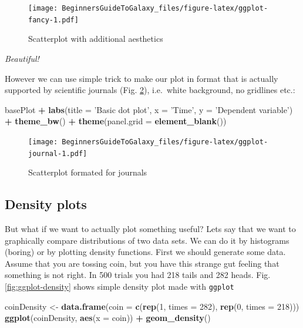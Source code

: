 \documentclass[]{book}
\newenvironment{Shaded}{\begin{snugshade}}{\end{snugshade}}
\newcommand{\KeywordTok}[1]{\textcolor[rgb]{0.13,0.29,0.53}{\textbf{#1}}}
\newcommand{\DataTypeTok}[1]{\textcolor[rgb]{0.13,0.29,0.53}{#1}}
\newcommand{\DecValTok}[1]{\textcolor[rgb]{0.00,0.00,0.81}{#1}}
\newcommand{\StringTok}[1]{\textcolor[rgb]{0.31,0.60,0.02}{#1}}
\newcommand{\OperatorTok}[1]{\textcolor[rgb]{0.81,0.36,0.00}{\textbf{#1}}}
\newcommand{\NormalTok}[1]{#1}
\theoremstyle{definition}
\theoremstyle{definition}
\theoremstyle{definition}
\theoremstyle{remark}
\begin{document}
\begin{figure}
\centering
\texttt{[image: BeginnersGuideToGalaxy\_files/figure-latex/ggplot-fancy-1.pdf]}
\caption{\label{fig:ggplot-fancy}Scatterplot with additional aesthetics}
\end{figure}

\emph{Beautiful!}

However we can use simple trick to make our plot in format that is
actually supported by scientific journals (Fig.
\ref{fig:ggplot-journal}), i.e.~white background, no gridlines etc.:

\begin{Shaded}
\begin{Highlighting}[]
\NormalTok{basePlot }\OperatorTok{+}
\StringTok{  }\KeywordTok{labs}\NormalTok{(}\DataTypeTok{title =} \StringTok{'Basic dot plot'}\NormalTok{, }\DataTypeTok{x =} \StringTok{'Time'}\NormalTok{, }\DataTypeTok{y =} \StringTok{'Dependent variable'}\NormalTok{) }\OperatorTok{+}
\StringTok{  }\KeywordTok{theme_bw}\NormalTok{() }\OperatorTok{+}
\StringTok{  }\KeywordTok{theme}\NormalTok{(}\DataTypeTok{panel.grid =} \KeywordTok{element_blank}\NormalTok{())}
\end{Highlighting}
\end{Shaded}

\begin{figure}
\centering
\texttt{[image: BeginnersGuideToGalaxy\_files/figure-latex/ggplot-journal-1.pdf]}
\caption{\label{fig:ggplot-journal}Scatterplot formated for journals}
\end{figure}

\subsection{Density plots}\label{density-plots}

But what if we want to actually plot something useful? Lets say that we
want to graphically compare distributions of two data sets. We can do it
by histograms (boring) or by plotting density functions. First we should
generate some data. Assume that you are tossing coin, but you have this
strange gut feeling that something is not right. In 500 trials you had
218 tails and 282 heads. Fig. \ref{fig:ggplot-density} shows simple
density plot made with \texttt{ggplot}

\begin{Shaded}
\begin{Highlighting}[]
\NormalTok{coinDensity <-}\StringTok{ }\KeywordTok{data.frame}\NormalTok{(}\DataTypeTok{coin =} \KeywordTok{c}\NormalTok{(}\KeywordTok{rep}\NormalTok{(}\DecValTok{1}\NormalTok{, }\DataTypeTok{times =} \DecValTok{282}\NormalTok{), }\KeywordTok{rep}\NormalTok{(}\DecValTok{0}\NormalTok{, }\DataTypeTok{times =} \DecValTok{218}\NormalTok{)))}
\KeywordTok{ggplot}\NormalTok{(coinDensity, }\KeywordTok{aes}\NormalTok{(}\DataTypeTok{x =}\NormalTok{ coin)) }\OperatorTok{+}\StringTok{ }\KeywordTok{geom_density}\NormalTok{()}
\end{Highlighting}
\end{Shaded}
\end{document}
